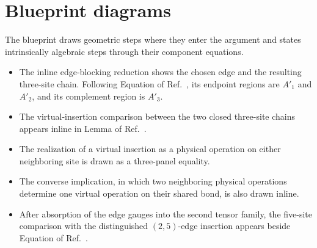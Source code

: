 \documentclass{article}
\begin{document}
\section{Blueprint diagrams}

The blueprint draws geometric steps where they enter the argument and states
intrinsically algebraic steps through their component equations.

\begin{itemize}
\item
The inline edge-blocking reduction shows the chosen edge and the resulting
three-site chain. Following Equation  of
Ref.~\cite{Molnar2018NormalPEPS}, its endpoint regions are $A'_1$ and $A'_2$,
and its complement region is $A'_3$.

\item
The virtual-insertion comparison between the two closed three-site chains
appears inline in Lemma  of
Ref.~\cite{Molnar2018NormalPEPS}.

\item
The realization of a virtual insertion as a physical operation on either
neighboring site is drawn as a three-panel equality.

\item
The converse implication, in which two neighboring physical operations
determine one virtual operation on their shared bond, is also drawn inline.

\item
After absorption of the edge gauges into the second tensor family, the
five-site comparison with the distinguished $(2,5)$-edge insertion appears
beside Equation  of
Ref.~\cite{Molnar2018NormalPEPS}.


\end{itemize}
\end{document}
